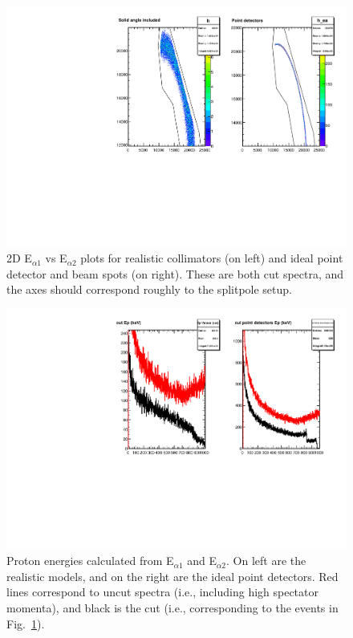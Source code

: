 \documentclass{article}
\begin{document}
\begin{figure}[!ht]
  \centering
  \includegraphics[width=\textwidth]{E1vsE2}
  \caption{2D E$_{\alpha 1}$ vs E$_{\alpha 2}$ plots for realistic
    collimators (on left) and ideal point detector and beam spots (on
    right). These are both cut spectra, and the axes should correspond
    roughly to the splitpole setup. }
  \label{fig:2D}
\end{figure}

\begin{figure}[!h]
  \centering
  \includegraphics[width=\textwidth]{Ep}
  \caption{Proton energies calculated from E$_{\alpha 1}$ and
    E$_{\alpha 2}$. On left are the realistic models, and on the right
    are the ideal point detectors. Red lines correspond to uncut
    spectra (i.e., including high spectator momenta), and black is the
    cut (i.e., corresponding to the events in Fig.\ \ref{fig:2D}).}
  \label{fig:Ep}
\end{figure}
\end{document}
